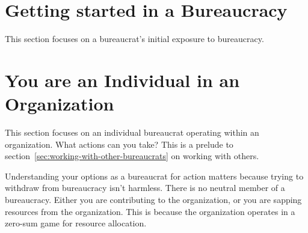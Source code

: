 \documentclass{book}
\begin{document}

  \chapter{Getting started in a Bureaucracy\label{sec:getting-started}}
    This section focuses on a bureaucrat's initial exposure to bureaucracy. 
  
    
    
    
    
    
    
    
    
    
  \clearpage
  \chapter{You are an Individual in an Organization\label{sec:individual-in-org}}
  
    This section focuses on an individual bureaucrat operating within an organization. What actions can you take?  This is a prelude to section~\ref{sec:working-with-other-bureaucrats} on working with others.
    
    Understanding your options as a bureaucrat for action matters because trying to withdraw from bureaucracy isn't harmless. There is no neutral member of a bureaucracy. Either you are contributing to the organization, or you are sapping resources from the organization. This is because the organization operates in a zero-sum game for resource allocation.
    
    
    
    
  \clearpage
    
    
    
    
    
    
    
    
    
  \clearpage

\end{document}
